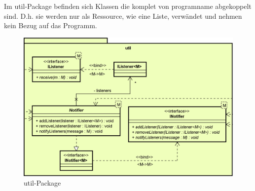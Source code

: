 Im util-Package befinden sich Klassen die komplet von \gls{programname} abgekoppelt
sind. D.h. sie werden nur als Ressource, wie eine Liste, verwändet und nehmen kein
Bezug auf das Programm.

\begin{figure}[H]
  \centering
  \includegraphics[width=\textwidth]{../diagramimages/util.png}
  \caption{util-Package}
\end{figure}

